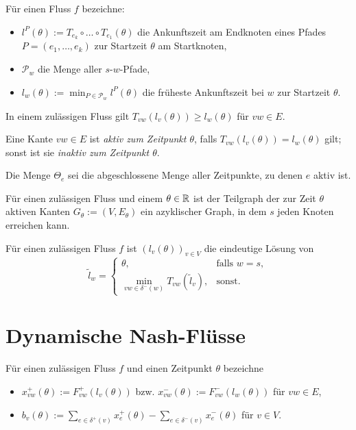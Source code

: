 	\begin{definition}
		Für einen Fluss $f$ bezeichne:
		\begin{itemize}[label=$\bullet$]
			\item $l^P(\theta) := T_{e_k}\circ\dots\circ T_{e_1}(\theta)$ die Ankunftszeit am Endknoten eines Pfades $P=(e_1,\dots,e_k)$ zur Startzeit $\theta$ am Startknoten,
			\item $\mathcal{P}_w$ die Menge aller $s$-$w$-Pfade,
			\item $l_w(\theta) := \min_{P\in\mathcal{P}_w} l^P(\theta)$ die früheste Ankunftszeit bei $w$ zur Startzeit $\theta$.
		\end{itemize}
	\end{definition}
	\begin{lemma}[Dreiecksungl.]
		In einem zulässigen Fluss gilt $T_{vw}(l_v(\theta))\geq l_w(\theta)$ für $vw\in E$.
	\end{lemma}

	\begin{definition}
		Eine Kante $vw\in E$ ist \emph{aktiv zum Zeitpunkt $\theta$}, falls $T_{vw}(l_v(\theta)) = l_w(\theta)$ gilt; sonst ist sie \emph{inaktiv zum Zeitpunkt $\theta$}.
		
		Die Menge $\Theta_e$ sei die abgeschlossene Menge aller Zeitpunkte, zu denen $e$ aktiv ist.
	\end{definition}
	\begin{lemma}
		Für einen zulässigen Fluss und einem $\theta\in\mathbb{R}$ ist der Teilgraph der zur Zeit $\theta$ aktiven Kanten $G_\theta:=(V, E_\theta)$ ein azyklischer Graph, in dem $s$ jeden Knoten erreichen kann.
	\end{lemma}
	\begin{proposition}
		Für einen zulässigen Fluss $f$ ist $(l_v(\theta))_{v\in V}$ die eindeutige Lösung von
		\[ \tilde{l}_w = \begin{cases}
		\theta, & \text{falls } w=s, \\
		\min\limits_{vw\in \delta^-(w)} T_{vw}(\tilde{l}_v), & \text{sonst}.
		\end{cases} \]
	\end{proposition}

\section{Dynamische Nash-Flüsse}	
	\begin{definition}
		Für einen zulässigen Fluss $f$ und einen Zeitpunkt $\theta$ bezeichne
		\begin{itemize}[label=$\bullet$]
			\item $x_{vw}^+(\theta):= F_{vw}^+(l_v(\theta))$ bzw. $x_{vw}^-(\theta):= F^-_{vw}(l_w(\theta))$ für $vw\in E$,
			\item $b_v(\theta) := \sum_{e\in\delta^+(v)} x_e^+(\theta) - \sum_{e\in\delta^-(v)} x_e^-(\theta)$ für $v\in V$.
		\end{itemize}
	\end{definition}
	

